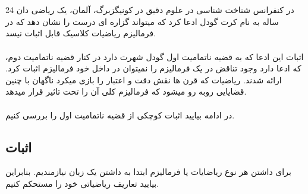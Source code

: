 \documentclass[9pt, twocolumn]{article}
\begin{document}
        \\
        \\
        در کنفرانس شناخت شناسی در علوم دقیق در کونیگزبرگ، آلمان، یک ریاضی دان 24 ساله به نام کرت گودل ادعا کرد که میتواند گزاره ای  درست را نشان دهد که در فرمالیزم ریاضیات کلاسیک قابل اثبات نیسد.
        \\
        \\
        اثبات این ادعا که به قضیه ناتمامیت اول گودل شهرت دارد در کنار قضیه ناتمامیت دوم، که ادعا دارد وجود تناقض در یک فرمالیزم را نمیتوان در داخل خود فرمالیزم اثبات کرد. ارائه شدند. ریاضیات که قرن ها نقش دقت و اعتبار را بازی میکرد ناگهان با چنین قضایایی روبه رو میشود که فرمالیزم کلی آن را تحت تاثیر قرار میدهد.
        \\
        \\
        در ادامه بیایید اثبات کوچکی از قضیه ناتمامیت اول را بررسی کنیم.
        \subsection{اثبات}
            برای داشتن هر نوع ریاضایات یا فرمالیزم ابتدا به داشتن یک زبان نیازمندیم. بنابراین بیایید تعاریف ریاضیاتی خود را مستحکم کنیم.
\end{document}
